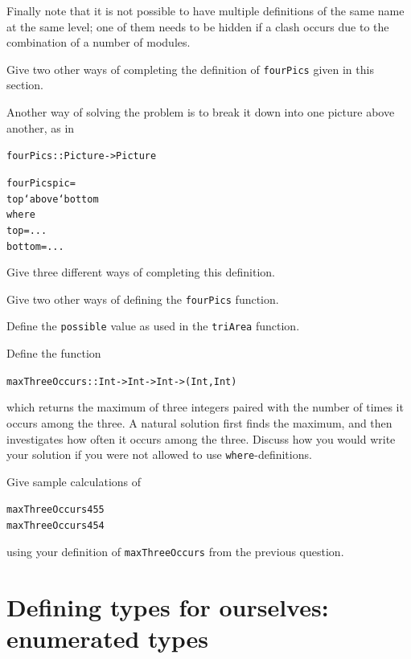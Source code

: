 Finally note that it is not possible to have multiple definitions of the
same name at the same level; one of them needs to be hidden if a clash
occurs due to the combination of a number of modules.


\begin{exercises}

\item
Give two other ways of completing the definition of \texttt{fourPics} given in this section.

\item
Another way of solving the problem is to break it down into one picture above another, as in
\begin{alltt}
fourPics :: Picture -> Picture

fourPics pic =
    top `above` bottom
      where
        top    = ...
        bottom = ...
\end{alltt}
Give three different ways of completing this definition.

\item
Give two other ways of defining the \texttt{fourPics} function.

\item
Define the \texttt{possible} value as used in the \texttt{triArea} function.



\item 
Define the function
\begin{alltt}
maxThreeOccurs :: Int -> Int -> Int -> (Int,Int)
\end{alltt}
which returns the maximum of three integers paired with the number of times
it occurs among the three.
A natural solution first finds the maximum, and then investigates how often
it occurs among the three. Discuss how you would write your solution if
you were not allowed to use \texttt{where}-definitions.

\item
Give sample calculations of 
\begin{alltt}
maxThreeOccurs 4 5 5
maxThreeOccurs 4 5 4
\end{alltt}
using your definition of \texttt{maxThreeOccurs} from the previous
question.

\end{exercises}


\section{Defining types for ourselves: enumerated types}
\label{EnumTypes}

